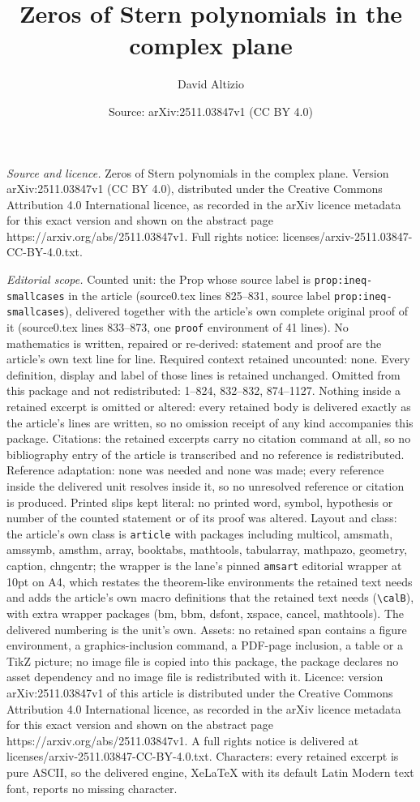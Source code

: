 \documentclass[10pt,a4paper]{amsart}
\title[Zeros of Stern polynomials in the complex plane]{Zeros of Stern polynomials in the complex plane}
\author{David Altizio}
\date{Source: arXiv:2511.03847v1 (CC BY 4.0)}
\begin{document}
\maketitle

\noindent\emph{Source and licence.} Zeros of Stern polynomials in the complex plane. Version arXiv:2511.03847v1 (CC BY 4.0), distributed under the Creative Commons Attribution 4.0 International licence, as recorded in the arXiv licence metadata for this exact version and shown on the abstract page https://arxiv.org/abs/2511.03847v1. Full rights notice: licenses/arxiv-2511.03847-CC-BY-4.0.txt.\par\smallskip

\noindent\textit{Editorial scope.} Counted unit: the Prop whose source label is \texttt{prop:ineq-smallcases} in the article (source0.tex lines 825--831, source label \texttt{prop:ineq-smallcases}), delivered together with the article's own complete original proof of it (source0.tex lines 833--873, one \texttt{proof} environment of 41 lines). No mathematics is written, repaired or re-derived: statement and proof are the article's own text line for line. Required context retained uncounted: none. Every definition, display and label of those lines is retained unchanged. Omitted from this package and not redistributed: 1--824, 832--832, 874--1127. Nothing inside a retained excerpt is omitted or altered: every retained body is delivered exactly as the article's lines are written, so no omission receipt of any kind accompanies this package. Citations: the retained excerpts carry no citation command at all, so no bibliography entry of the article is transcribed and no reference is redistributed. Reference adaptation: none was needed and none was made; every reference inside the delivered unit resolves inside it, so no unresolved reference or citation is produced. Printed slips kept literal: no printed word, symbol, hypothesis or number of the counted statement or of its proof was altered. Layout and class: the article's own class is \texttt{article} with packages including multicol, amsmath, amssymb, amsthm, array, booktabs, mathtools, tabularray, mathpazo, geometry, caption, chngcntr; the wrapper is the lane's pinned \texttt{amsart} editorial wrapper at 10pt on A4, which restates the theorem-like environments the retained text needs and adds the article's own macro definitions that the retained text needs (\texttt{\textbackslash calB}), with extra wrapper packages (bm, bbm, dsfont, xspace, cancel, mathtools). The delivered numbering is the unit's own. Assets: no retained span contains a figure environment, a graphics-inclusion command, a PDF-page inclusion, a table or a TikZ picture; no image file is copied into this package, the package declares no asset dependency and no image file is redistributed with it. Licence: version arXiv:2511.03847v1 of this article is distributed under the Creative Commons Attribution 4.0 International licence, as recorded in the arXiv licence metadata for this exact version and shown on the abstract page https://arxiv.org/abs/2511.03847v1. A full rights notice is delivered at licenses/arxiv-2511.03847-CC-BY-4.0.txt. Characters: every retained excerpt is pure ASCII, so the delivered engine, XeLaTeX with its default Latin Modern text font, reports no missing character.
\end{document}
